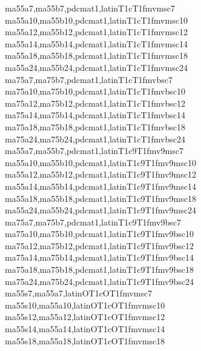         {ma55a7,ma55b7,pdcmat1,latin}{T1c}{T1}{fmv}{m}{sc}{7}
        {ma55a10,ma55b10,pdcmat1,latin}{T1c}{T1}{fmv}{m}{sc}{10}
        {ma55a12,ma55b12,pdcmat1,latin}{T1c}{T1}{fmv}{m}{sc}{12}
        {ma55a14,ma55b14,pdcmat1,latin}{T1c}{T1}{fmv}{m}{sc}{14}
        {ma55a18,ma55b18,pdcmat1,latin}{T1c}{T1}{fmv}{m}{sc}{18}
        {ma55a24,ma55b24,pdcmat1,latin}{T1c}{T1}{fmv}{m}{sc}{24}
        {ma75a7,ma75b7,pdcmat1,latin}{T1c}{T1}{fmv}{b}{sc}{7}
        {ma75a10,ma75b10,pdcmat1,latin}{T1c}{T1}{fmv}{b}{sc}{10}
        {ma75a12,ma75b12,pdcmat1,latin}{T1c}{T1}{fmv}{b}{sc}{12}
        {ma75a14,ma75b14,pdcmat1,latin}{T1c}{T1}{fmv}{b}{sc}{14}
        {ma75a18,ma75b18,pdcmat1,latin}{T1c}{T1}{fmv}{b}{sc}{18}
        {ma75a24,ma75b24,pdcmat1,latin}{T1c}{T1}{fmv}{b}{sc}{24}
        {ma55a7,ma55b7,pdcmat1,latin}{T1c9}{T1}{fmv9}{m}{sc}{7}
        {ma55a10,ma55b10,pdcmat1,latin}{T1c9}{T1}{fmv9}{m}{sc}{10}
        {ma55a12,ma55b12,pdcmat1,latin}{T1c9}{T1}{fmv9}{m}{sc}{12}
        {ma55a14,ma55b14,pdcmat1,latin}{T1c9}{T1}{fmv9}{m}{sc}{14}
        {ma55a18,ma55b18,pdcmat1,latin}{T1c9}{T1}{fmv9}{m}{sc}{18}
        {ma55a24,ma55b24,pdcmat1,latin}{T1c9}{T1}{fmv9}{m}{sc}{24}
        {ma75a7,ma75b7,pdcmat1,latin}{T1c9}{T1}{fmv9}{b}{sc}{7}
        {ma75a10,ma75b10,pdcmat1,latin}{T1c9}{T1}{fmv9}{b}{sc}{10}
        {ma75a12,ma75b12,pdcmat1,latin}{T1c9}{T1}{fmv9}{b}{sc}{12}
        {ma75a14,ma75b14,pdcmat1,latin}{T1c9}{T1}{fmv9}{b}{sc}{14}
        {ma75a18,ma75b18,pdcmat1,latin}{T1c9}{T1}{fmv9}{b}{sc}{18}
        {ma75a24,ma75b24,pdcmat1,latin}{T1c9}{T1}{fmv9}{b}{sc}{24}
        {ma55s7,ma55a7,latin}{OT1c}{OT1}{fmv}{m}{sc}{7}
        {ma55s10,ma55a10,latin}{OT1c}{OT1}{fmv}{m}{sc}{10}
        {ma55s12,ma55a12,latin}{OT1c}{OT1}{fmv}{m}{sc}{12}
        {ma55s14,ma55a14,latin}{OT1c}{OT1}{fmv}{m}{sc}{14}
        {ma55s18,ma55a18,latin}{OT1c}{OT1}{fmv}{m}{sc}{18}
